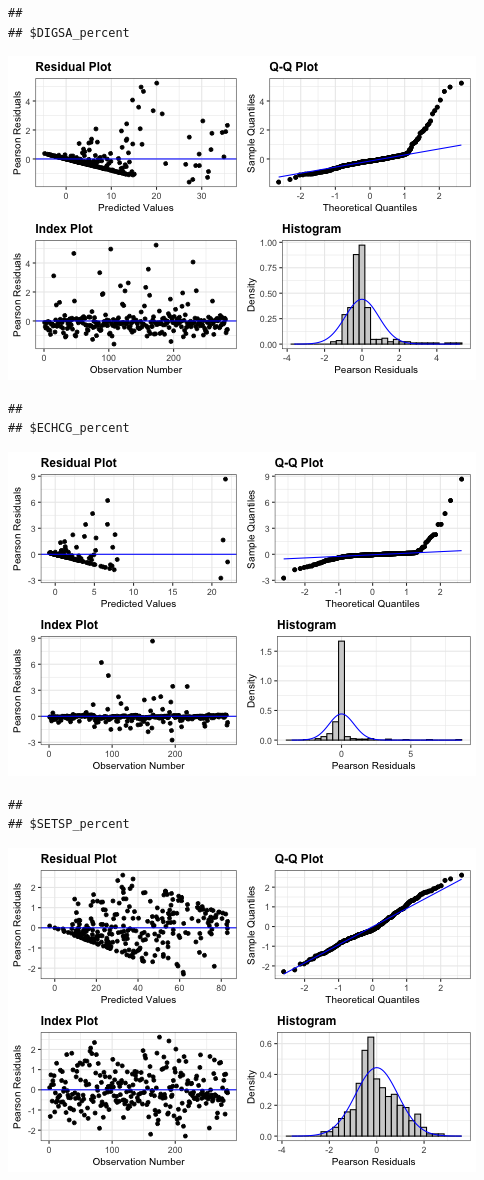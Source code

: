 \documentclass[
]{article}
\begin{document}
\begin{verbatim}
## 
## $DIGSA_percent
\end{verbatim}

\includegraphics{Individual-sp-difference_files/figure-latex/unnamed-chunk-14-3.png}

\begin{verbatim}
## 
## $ECHCG_percent
\end{verbatim}

\includegraphics{Individual-sp-difference_files/figure-latex/unnamed-chunk-14-4.png}

\begin{verbatim}
## 
## $SETSP_percent
\end{verbatim}

\includegraphics{Individual-sp-difference_files/figure-latex/unnamed-chunk-14-5.png}
\end{document}
